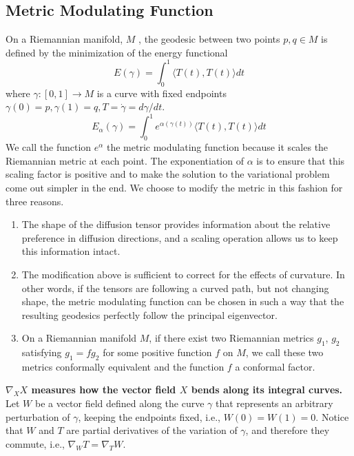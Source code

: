 \documentclass{article}
\theoremstyle{definition}
\theoremstyle{plain}
\begin{document}
\subsection{Metric Modulating Function}
On a Riemannian manifold, $M$ , the geodesic between two points $p, q \in M$ is defined by the minimization of the energy functional
\begin{equation*}
    E(\gamma)=\int^1_0\langle T(t),T(t)\rangle dt
\end{equation*}
where $\gamma:[0,1]\rightarrow M$ is a curve with fixed endpoints $\gamma(0)=p, \gamma(1)=q, T=\Dot{\gamma}=d\gamma/dt$.
\begin{equation*}
    E_\alpha(\gamma)=\int^1_0e^{\alpha(\gamma(t))}\langle T(t),T(t)\rangle dt
\end{equation*}
We call the function $e^\alpha$ the metric modulating function because it scales the Riemannian metric at each point. The exponentiation of $\alpha$ is to ensure that this scaling factor is positive and to make the solution to the variational problem come out simpler in the end. We choose to modify the metric in this fashion for three reasons. 
\begin{enumerate}
    \item The shape of the diffusion tensor provides information about the relative preference in diffusion directions, and a scaling operation allows us to keep this information intact.
    \item The modification above is sufficient to correct for the effects of curvature. In other words, if the tensors are following a curved path, but not changing shape, the metric modulating function can be chosen in such a way that the resulting geodesics perfectly follow the principal eigenvector. 
    \item On a Riemannian manifold $M$, if there exist two Riemannian metrics $g_1$, $g_2$ satisfying $g_1 = fg_2$ for some positive function $f$ on $M$, we call these two metrics conformally equivalent and the function $f$ a conformal factor.
\end{enumerate}

\textbf{$\nabla_{X}X$ measures how the vector field $X$ bends along its integral curves.} Let $W$ be a vector field defined along the curve $\gamma$ that represents an arbitrary perturbation of $\gamma$, keeping the endpoints fixed, i.e., $W (0) = W (1) = 0$. Notice
that $W$ and $T$ are partial derivatives of the variation of $\gamma$, and therefore they commute, i.e., $\nabla_WT = \nabla_TW$.
\end{document}
